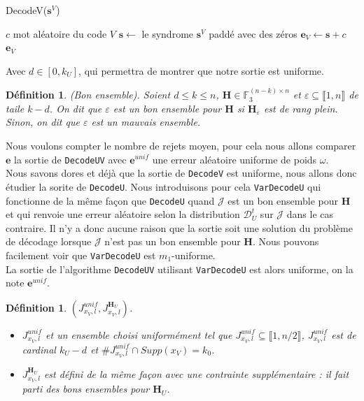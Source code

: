 \documentclass[12pt]{article}
\theoremstyle{plain}
\newtheorem{defi}[thm]{Définition}
\newcommand{\F}{\mathbb{F}}
\newcommand{\e}{\mathbf{e}}
\newcommand{\s}{\mathbf{s}}
\newcommand{\J}{\mathcal{J}}
\newcommand{\D}{\mathcal{D}}
\begin{document}
\begin{algorithm}
	\caption{DecodeV($\s^V$)}
	\begin{algorithmic}[1]
    	\STATE $c$ mot aléatoire du code $V$
    	\STATE $\s \leftarrow$ le syndrome $\s^V$ paddé avec des zéros
    	\STATE $\e_V \leftarrow \s + c$
    	\RETURN $\e_V$
    \end{algorithmic}
\end{algorithm}

Avec $d\in [0,k_U]$, qui permettra de montrer que notre sortie est uniforme.

\begin{defi} (Bon ensemble).
Soient $d \leq k \leq n$, $\mathbf{H}\in\F_3^{(n-k)\times n}$ et $\varepsilon \subseteq \llbracket1,n\rrbracket$ de taile $k-d$. On dit que $\varepsilon$ est un bon ensemble pour $\mathbf{H}$ si $\mathbf{H}_{\overline{\varepsilon}}$ est de rang plein. Sinon, on dit que $\varepsilon$ est un mauvais ensemble.
\end{defi}


Nous voulons compter le nombre de rejets moyen, pour cela nous allons comparer $\e$ la sortie de \verb|DecodeUV| avec $\e^{unif}$ une erreur aléatoire uniforme de poids $\omega$.\\
Nous savons dores et déjà que la sortie de \verb|DecodeV| est uniforme, nous allons donc étudier la sorite de \verb|DecodeU|.
Nous introduisons pour cela \verb|VarDecodeU| qui fonctionne de la même façon que \verb|DecodeU| quand $\J$ est un bon ensemble pour $\mathbf{H}$ et qui renvoie une erreur aléatoire selon la distribution $\D_U^t$ sur $\J$ dans le cas contraire.
Il n'y a donc aucune raison que la sortie soit une solution du problème de décodage lorsque $\J$ n'est pas un bon ensemble pour $\mathbf{H}$.
Nous pouvons facilement voir que \verb|VarDecodeU| est $m_1$-uniforme.\\
La sortie de l'algorithme \verb|DecodeUV| utilisant \verb|VarDecodeU| est alors uniforme, on la note $\e^{unif}$.\\

\begin{defi} $(J_{x_V,l}^{unif},J_{x_V, l}^{\mathbf{H}_U})$.\\
\begin{itemize}
\item $J_{x_V,l}^{unif}$ et un ensemble choisi uniformément tel que $J_{x_V,l}^{unif}\subseteq \llbracket 1,n/2 \rrbracket$, $J_{x_V,l}^{unif}$ est de cardinal $k_U-d$ et $\#J_{x_V,l}^{unif}\cap Supp(x_V) = k_0$. 
\item $J_{x_V, l}^{\mathbf{H}_U}$ est défini de la même façon avec une contrainte supplémentaire : il fait parti des bons ensembles pour $\mathbf{H}_U$.
\end{itemize}
\end{defi}
\end{document}
